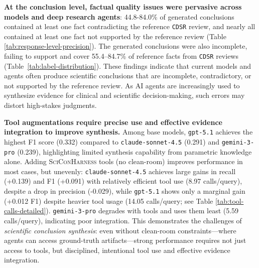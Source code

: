 \documentclass{article}
\begin{document}
\textbf{At the conclusion level, factual quality issues were pervasive across models and deep research agents}: 44.8-84.0\% of generated conclusions contained at least one fact contradicting the reference \texttt{CDSR} review, and nearly all contained at least one fact not supported by the reference review (Table \ref{tab:response-level-precision}). The generated conclusions were also incomplete, failing to support and cover 55.4--84.7\% of reference facts from \texttt{CDSR} reviews (Table~\ref{tab:label-distribution}). These findings indicate that current models and agents often produce scientific conclusions that are incomplete, contradictory, or not supported by the reference review. As AI agents are increasingly used to synthesize evidence for clinical and scientific decision-making, such errors may distort high-stakes judgments.


\textbf{Tool augmentations require precise use and effective evidence integration to improve synthesis.} Among base models, \texttt{gpt-5.1} achieves the highest F1 score (0.332) compared to \texttt{claude-sonnet-4.5} (0.291) and \texttt{gemini-3-pro} (0.239), highlighting limited synthesis capability from parametric knowledge alone. Adding \textsc{SciConHarness} tools (no clean-room) improves performance in most cases, but unevenly: \texttt{claude-sonnet-4.5} achieves large gains in recall (+0.139) and F1 (+0.091) with relatively efficient tool use (8.97 calls/query), despite a drop in precision (-0.029), while \texttt{gpt-5.1} shows only a marginal gain (+0.012 F1) despite heavier tool usage (14.05 calls/query; see Table \ref{tab:tool-calls-detailed}). \texttt{gemini-3-pro} degrades with tools and uses them least (5.59 calls/query), indicating poor integration. This demonstrates the challenges of \textit{scientific conclusion synthesis}: even without clean-room constraints---where agents can access ground-truth artifacts---strong performance requires not just access to tools, but disciplined, intentional tool use and effective evidence integration. 
\end{document}
